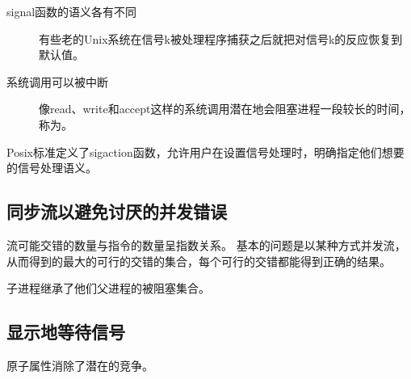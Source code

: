 {{{            \begin{description}
                \item[signal函数的语义各有不同]
                {
                    有些老的Unix系统在信号k被处理程序捕获之后就把对信号k的反应恢复到默认值。
                }
                \item[系统调用可以被中断]
                {
                    像read、write和accept这样的系统调用潜在地会阻塞进程一段较长的时间，称为。
                }
            \end{description}

            Posix标准定义了sigaction函数，允许用户在设置信号处理时，明确指定他们想要的信号处理语义。
        }
    }

    \subsection{同步流以避免讨厌的并发错误}
    {
        流可能交错的数量与指令的数量呈指数关系。
        基本的问题是以某种方式并发流，从而得到的最大的可行的交错的集合，每个可行的交错都能得到正确的结果。

        子进程继承了他们父进程的被阻塞集合。
    }

    \subsection{显示地等待信号}
    {
        原子属性消除了潜在的竞争。
    }
}
